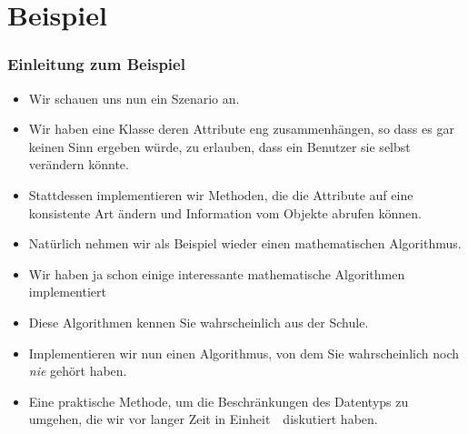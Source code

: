 \documentclass[aspectratio=169,mathserif,notheorems]{beamer}%
\begin{document}
\section{Beispiel}%
%
\begin{frame}[t]%
\frametitle{Einleitung zum Beispiel}%
\begin{itemize}%
%
\item Wir schauen uns nun ein Szenario an.%
%
\item<2-> Wir haben eine Klasse deren Attribute eng zusammenhängen, so dass es gar keinen Sinn ergeben würde, zu erlauben, dass ein Benutzer sie selbst verändern könnte.%
%
\item<3-> Stattdessen implementieren wir Methoden, die die Attribute auf eine konsistente Art ändern und Information vom Objekte abrufen können.%
%
\item<5-> Natürlich nehmen wir als Beispiel wieder einen mathematischen Algorithmus.%
%
\item<6-> Wir haben ja schon einige interessante mathematische Algorithmen implementiert%
%
\item<10-> Diese Algorithmen kennen Sie wahrscheinlich aus der Schule.%
%
\item<11-> Implementieren wir nun einen Algorithmus, von dem Sie wahrscheinlich noch \emph{nie} gehört haben.%
%
\item<12-> Eine praktische Methode, um die Beschränkungen des Datentyps  zu umgehen, die wir vor langer Zeit in Einheit~\unitFloat\ diskutiert haben.%
%
\end{itemize}%
\end{frame}%
%
\end{document}
